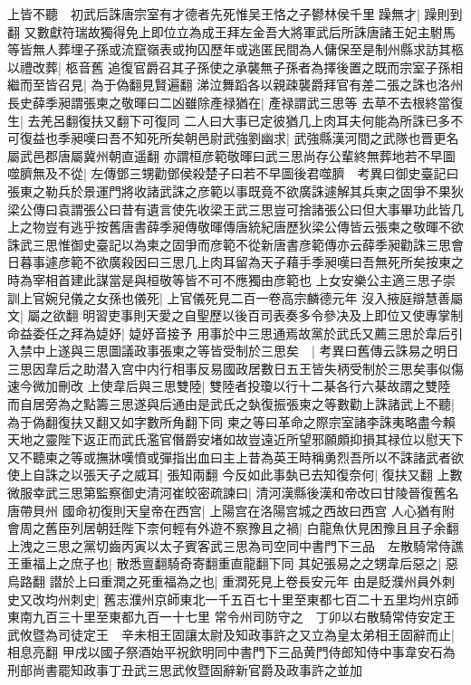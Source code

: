 上皆不聽　初武后誅唐宗室有才德者先死惟吴王恪之子鬰林侯千里躁無才|{
	躁則到翻}
又數獻符瑞故獨得免上即位立為成王拜左金吾大將軍武后所誅唐諸王妃主駙馬等皆無人葬埋子孫或流竄嶺表或拘囚歷年或逃匿民間為人傭保至是制州縣求訪其柩以禮改葬|{
	柩音舊}
追復官爵召其子孫使之承襲無子孫者為擇後置之既而宗室子孫相繼而至皆召見|{
	為于偽翻見賢遍翻}
涕泣舞蹈各以親疎襲爵拜官有差二張之誅也洛州長史薛季昶謂張柬之敬暉曰二凶雖除產禄猶在|{
	產禄謂武三思等}
去草不去根終當復生|{
	去羌呂翻復扶又翻下可復同}
二人曰大事已定彼猶几上肉耳夫何能為所誅已多不可復益也季昶嘆曰吾不知死所矣朝邑尉武強劉幽求|{
	武強縣漢河間之武隊也晋更名屬武邑郡唐屬冀州朝直遥翻}
亦謂桓彦範敬暉曰武三思尚存公輩終無葬地若不早圖噬臍無及不從|{
	左傳鄧三甥勸鄧侯殺楚子曰若不早圖後君噬臍　考異曰御史臺記曰張東之勒兵於景運門將收諸武誅之彦範以事既竟不欲廣誅遽解其兵柬之固爭不果狄梁公傳曰袁謂張公曰昔有遺言使先收梁王武三思豈可捨諸張公曰但大事畢功此皆几上之物豈有逃乎按舊唐書薛季昶傳敬暉傳唐統紀唐歷狄梁公傳皆云張柬之敬暉不欲誅武三思惟御史臺記以為柬之固爭而彦範不從新唐書彦範傳亦云薛季昶勸誅三思會日暮事遽彦範不欲廣殺因曰三思几上肉耳留為天子藉手季昶嘆曰吾無死所矣按東之時為宰相首建此謀當是與桓敬等皆不可不應獨由彦範也}
上女安樂公主適三思子崇訓上官婉兒儀之女孫也儀死|{
	上官儀死見二百一卷高宗麟德元年}
沒入掖庭辯慧善屬文|{
	屬之欲翻}
明習吏事則天愛之自聖歷以後百司表奏多令參决及上即位又使專掌制命益委任之拜為媫妤|{
	媫妤音接予}
用事於中三思通焉故黨於武氏又薦三思於韋后引入禁中上遂與三思圖議政事張柬之等皆受制於三思矣　|{
	考異曰舊傳云誅易之明日三思因韋后之助潜入宫中内行相事反易國政居數日五王皆失柄受制於三思矣事似傷速今微加刪改}
上使韋后與三思雙陸|{
	雙陸者投瓊以行十二棊各行六棊故謂之雙陸}
而自居旁為之點籌三思遂與后通由是武氏之埶復振張柬之等數勸上誅諸武上不聽|{
	為于偽翻復扶又翻又如字數所角翻下同}
柬之等曰革命之際宗室諸李誅夷略盡今賴天地之靈陛下返正而武氏濫官僭爵安堵如故豈遠近所望邪願頗抑損其禄位以慰天下又不聽柬之等或撫牀嘆憤或彈指出血曰主上昔為英王時稱勇烈吾所以不誅諸武者欲使上自誅之以張天子之威耳|{
	張知兩翻}
今反如此事埶已去知復奈何|{
	復扶又翻}
上數微服幸武三思第監察御史清河崔皎密疏諫曰|{
	清河漢縣後漢和帝改曰甘陵晉復舊名唐帶貝州}
國命初復則天皇帝在西宫|{
	上陽宫在洛陽宫城之西故曰西宫}
人心猶有附會周之舊臣列居朝廷陛下柰何輕有外遊不察豫且之禍|{
	白龍魚㐲見困豫且且子余翻}
上洩之三思之黨切齒丙寅以太子賓客武三思為司空同中書門下三品　左散騎常侍譙王重福上之庶子也|{
	散悉亶翻騎奇寄翻重直龍翻下同}
其妃張易之之甥韋后惡之|{
	惡烏路翻}
譛於上曰重潤之死重福為之也|{
	重潤死見上卷長安元年}
由是貶濮州員外刺史又改均州刺史|{
	舊志濮州京師東北一千五百七十里至東都七百二十五里均州京師東南九百三十里至東都九百一十七里}
常令州司防守之　丁卯以右散騎常侍安定王武攸暨為司徒定王　辛未相王固讓太尉及知政事許之又立為皇太弟相王固辭而止|{
	相息亮翻}
甲戌以國子祭酒始平祝欽明同中書門下三品黄門侍郎知侍中事韋安石為刑部尚書罷知政事丁丑武三思武攸暨固辭新官爵及政事許之並加

